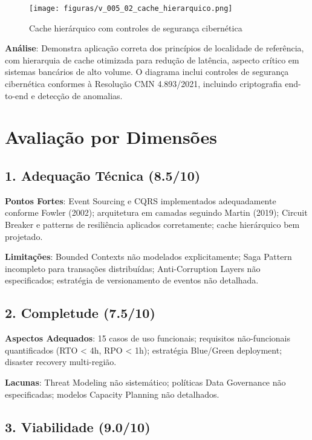 \begin{figure}[h]
    \centering
    \texttt{[image: figuras/v\_005\_02\_cache\_hierarquico.png]} 
    \caption{Cache hierárquico com controles de segurança cibernética}
    \label{fig:v_005_02_cache_hierarquico}
\end{figure}

\textbf{Análise}: Demonstra aplicação correta dos princípios de localidade de referência, com hierarquia de cache otimizada para redução de latência, aspecto crítico em sistemas bancários de alto volume. O diagrama inclui controles de segurança cibernética conformes à Resolução CMN 4.893/2021, incluindo criptografia end-to-end e detecção de anomalias.

\section{Avaliação por Dimensões}

\subsection{1. Adequação Técnica (8.5/10)}

\textbf{Pontos Fortes}: Event Sourcing e CQRS implementados adequadamente conforme Fowler (2002); arquitetura em camadas seguindo Martin (2019); Circuit Breaker e patterns de resiliência aplicados corretamente; cache hierárquico bem projetado.

\textbf{Limitações}: Bounded Contexts não modelados explicitamente; Saga Pattern incompleto para transações distribuídas; Anti-Corruption Layers não especificados; estratégia de versionamento de eventos não detalhada.

\subsection{2. Completude (7.5/10)}

\textbf{Aspectos Adequados}: 15 casos de uso funcionais; requisitos não-funcionais quantificados (RTO < 4h, RPO < 1h); estratégia Blue/Green deployment; disaster recovery multi-região.

\textbf{Lacunas}: Threat Modeling não sistemático; políticas Data Governance não especificadas; modelos Capacity Planning não detalhados.

\subsection{3. Viabilidade (9.0/10)}

